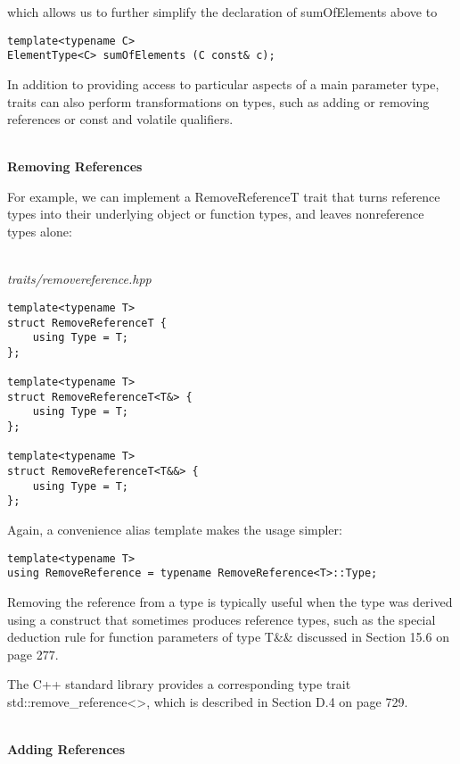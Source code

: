 which allows us to further simplify the declaration of sumOfElements above to

\begin{lstlisting}[style=styleCXX]
template<typename C>
ElementType<C> sumOfElements (C const& c);
\end{lstlisting}



In addition to providing access to particular aspects of a main parameter type, traits can also perform transformations on types, such as adding or removing references or const and volatile qualifiers.

\hspace*{\fill} \\ %
\noindent
\textbf{Removing References}

For example, we can implement a RemoveReferenceT trait that turns reference types into their underlying object or function types, and leaves nonreference types alone:

\hspace*{\fill} \\ %
\noindent
\textit{traits/removereference.hpp}
\begin{lstlisting}[style=styleCXX]
template<typename T>
struct RemoveReferenceT {
	using Type = T;
};

template<typename T>
struct RemoveReferenceT<T&> {
	using Type = T;
};

template<typename T>
struct RemoveReferenceT<T&&> {
	using Type = T;
};
\end{lstlisting}

Again, a convenience alias template makes the usage simpler:

\begin{lstlisting}[style=styleCXX]
template<typename T>
using RemoveReference = typename RemoveReference<T>::Type;
\end{lstlisting}

Removing the reference from a type is typically useful when the type was derived using a construct that sometimes produces reference types, such as the special deduction rule for function parameters of type T\&\& discussed in Section 15.6 on page 277.

The C++ standard library provides a corresponding type trait std::remove\_reference<>, which is described in Section D.4 on page 729.

\hspace*{\fill} \\ %
\noindent
\textbf{Adding References}

